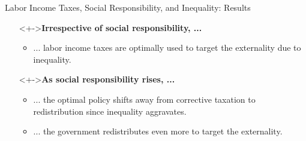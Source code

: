 \begin{frame}{Labor Income Taxes, Social Responsibility, and Inequality: Results}

	\begin{itemize}
	\item[]<+->\textbf{\alert{Irrespective of social responsibility, ...}}
	\vspace{4mm}
	\begin{itemize}[<+-| alert@+>]
		\item<+-| alert@+>  ... labor income taxes are optimally used to target the externality due to inequality.
		\vspace{3mm}
	\end{itemize}
	
	\item[]<+->\textbf{\alert{As social responsibility rises, ...}}
	\vspace{4mm}
	\begin{itemize}[<+-| alert@+>]
		\item<+-| alert@+>  ... the optimal policy shifts away from corrective taxation to redistribution since inequality aggravates.
		\vspace{3mm}
		\item<+-| alert@+> ... the government redistributes even more to target the externality.
		
	\end{itemize}
	\end{itemize}
\end{frame}

